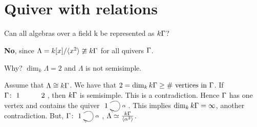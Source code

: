 \section{Quiver with relations}
Can all algebras over a field k be represented as $k\Gamma$?

\textbf{No}, since $\Lambda = k[x]/\langle x^2\rangle \ncong k\Gamma$ for
all quivers $\Gamma$.

Why? $\dim_{k}\Lambda = 2$ and $\Lambda$ is not semisimple.

Assume that  $\Lambda \cong k\Gamma$.  We have that $2 = \dim_kk\Gamma \ge
\text{\# vertices in\ } \Gamma$.   If $\G \colon \xymatrix{1& 2}$,  then
$k\Gamma$ is semisimple. This is a  contradiction. Hence $\Gamma$ has one
vertex and contains the quiver  $\xymatrix{1\ar@(ur,dr)^\alpha}$.
This implies $\dim_kk\Gamma = \infty$, another contradiction.  But,
$\G\colon \xymatrix{1\ar@(ur,dr)^\alpha}$, $\Lambda \simeq
\frac{k\Gamma}{\langle\alpha^2\rangle} $.

